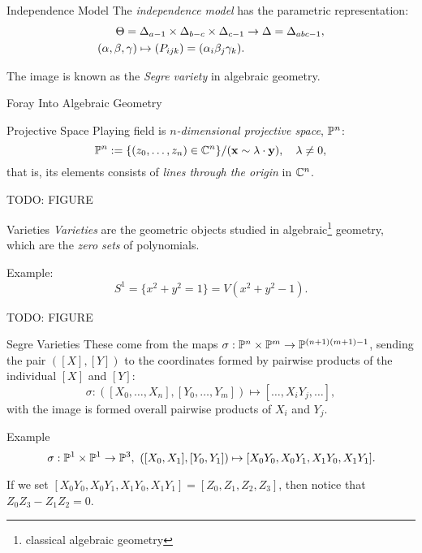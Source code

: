 \begin{frame}{Independence Model}
    The \emph{independence model} has the parametric representation:
    \begin{equation*}
        \begin{split}
            \Theta = \Delta_{a-1} \times \Delta_{b-c} \times \Delta_{c-1} &\rightarrow \Delta = \Delta_{abc - 1}, \\
            (\alpha,\beta,\gamma) \mapsto (P_{ijk}) = (\alpha_{i}\beta_{j}\gamma_{k}).
        \end{split}
    \end{equation*}

    The image is known as the \emph{Segre variety} in algebraic geometry.
\end{frame}

\begin{frame}{Foray Into Algebraic Geometry}
    \begin{block}{Projective Space}
    Playing field is $n$\emph{-dimensional projective space}, $\mathbb{P}^{n}$:
        $$ \mathbb{P}^{n} := \{ (z_{0}, \ldots, z_{n}) \in \mathbb{C}^{n} \} / (\vb{x} \sim \lambda \cdot \vb{y}), \quad \lambda \neq 0, $$
    that is, its elements consists of \emph{lines through the origin} in $\mathbb{C}^{n}$.
    \end{block}
    
    TODO: FIGURE
\end{frame}

\begin{frame}{Varieties}
        \emph{Varieties} are the geometric objects studied in algebraic\footnote{classical algebraic geometry} geometry, which are the \emph{zero sets} of polynomials.

        Example:
        $$ S^{1} = \{ x^{2} + y^{2} = 1 \} = V( x^{2} + y^{2} - 1 ). $$

    TODO: FIGURE
\end{frame}

\begin{frame}{Segre Varieties}
        These come from the maps $\sigma: \mathbb{P}^{n} \times \mathbb{P}^{m} \rightarrow \mathbb{P}^{(n+1)(m+1) - 1}$, sending the pair $([X],[Y])$ to the coordinates formed by pairwise products of the individual $[X]$ and $[Y]$:
            $$ \sigma : ([X_{0}, \ldots, X_{n}], [Y_{0}, \ldots, Y_{m}]) \mapsto [\ldots, X_{i}Y_{j}, \ldots ], $$
        with the image is formed overall pairwise products of $X_{i}$ and $Y_{j}$.

        \begin{block}{Example}
        $$\sigma : \mathbb{P}^{1} \times \mathbb{P}^{1} \rightarrow \mathbb{P}^{3},\ ([X_{0}, X_{1}], [Y_{0}, Y_{1}]) \mapsto [ X_{0}Y_{0}, X_{0}Y_{1}, X_{1}Y_{0}, X_{1}Y_{1} ].  $$
        
        If we set $[ X_{0}Y_{0}, X_{0}Y_{1}, X_{1}Y_{0}, X_{1}Y_{1} ] = [Z_{0}, Z_{1}, Z_{2}, Z_{3}]$, then notice that $Z_{0}Z_{3} - Z_{1}Z_{2} = 0$.
        \end{block}
\end{frame}
